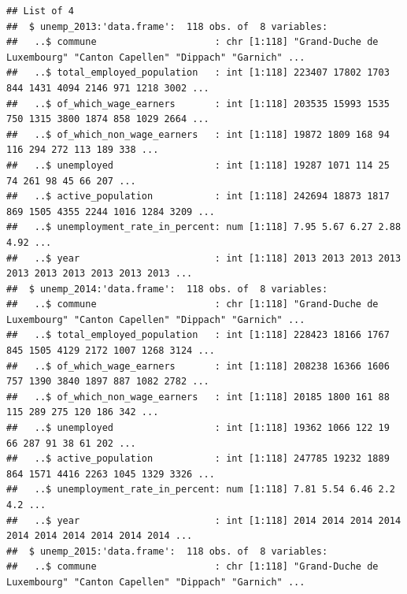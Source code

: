 \documentclass[]{gitbook}
\newenvironment{Shaded}{\begin{snugshade}}{\end{snugshade}}
\newcommand{\KeywordTok}[1]{\textcolor[rgb]{0.13,0.29,0.53}{\textbf{#1}}}
\newcommand{\NormalTok}[1]{#1}
\newcommand{\OperatorTok}[1]{\textcolor[rgb]{0.81,0.36,0.00}{\textbf{#1}}}
\newcommand{\StringTok}[1]{\textcolor[rgb]{0.31,0.60,0.02}{#1}}
\theoremstyle{definition}
\theoremstyle{definition}
\theoremstyle{definition}
\theoremstyle{remark}
\begin{document}
\begin{Shaded}
\end{Shaded}

\begin{verbatim}
## List of 4
##  $ unemp_2013:'data.frame':  118 obs. of  8 variables:
##   ..$ commune                     : chr [1:118] "Grand-Duche de Luxembourg" "Canton Capellen" "Dippach" "Garnich" ...
##   ..$ total_employed_population   : int [1:118] 223407 17802 1703 844 1431 4094 2146 971 1218 3002 ...
##   ..$ of_which_wage_earners       : int [1:118] 203535 15993 1535 750 1315 3800 1874 858 1029 2664 ...
##   ..$ of_which_non_wage_earners   : int [1:118] 19872 1809 168 94 116 294 272 113 189 338 ...
##   ..$ unemployed                  : int [1:118] 19287 1071 114 25 74 261 98 45 66 207 ...
##   ..$ active_population           : int [1:118] 242694 18873 1817 869 1505 4355 2244 1016 1284 3209 ...
##   ..$ unemployment_rate_in_percent: num [1:118] 7.95 5.67 6.27 2.88 4.92 ...
##   ..$ year                        : int [1:118] 2013 2013 2013 2013 2013 2013 2013 2013 2013 2013 ...
##  $ unemp_2014:'data.frame':  118 obs. of  8 variables:
##   ..$ commune                     : chr [1:118] "Grand-Duche de Luxembourg" "Canton Capellen" "Dippach" "Garnich" ...
##   ..$ total_employed_population   : int [1:118] 228423 18166 1767 845 1505 4129 2172 1007 1268 3124 ...
##   ..$ of_which_wage_earners       : int [1:118] 208238 16366 1606 757 1390 3840 1897 887 1082 2782 ...
##   ..$ of_which_non_wage_earners   : int [1:118] 20185 1800 161 88 115 289 275 120 186 342 ...
##   ..$ unemployed                  : int [1:118] 19362 1066 122 19 66 287 91 38 61 202 ...
##   ..$ active_population           : int [1:118] 247785 19232 1889 864 1571 4416 2263 1045 1329 3326 ...
##   ..$ unemployment_rate_in_percent: num [1:118] 7.81 5.54 6.46 2.2 4.2 ...
##   ..$ year                        : int [1:118] 2014 2014 2014 2014 2014 2014 2014 2014 2014 2014 ...
##  $ unemp_2015:'data.frame':  118 obs. of  8 variables:
##   ..$ commune                     : chr [1:118] "Grand-Duche de Luxembourg" "Canton Capellen" "Dippach" "Garnich" ...

\end{verbatim}
\end{document}
